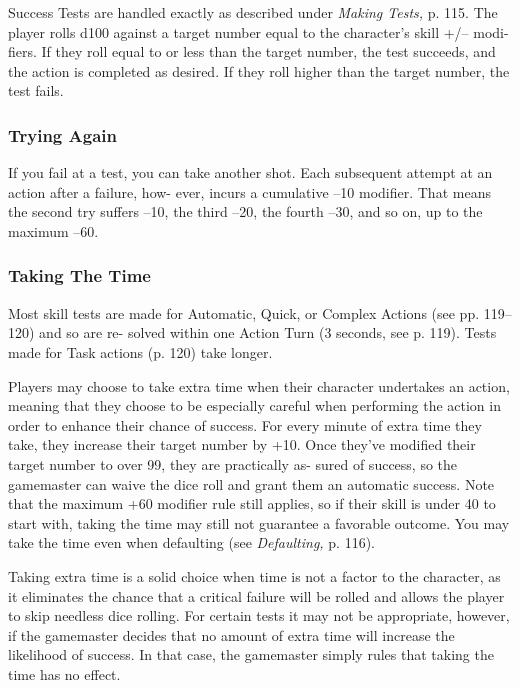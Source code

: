 Success Tests are handled exactly as described under 
\textit{Making Tests,} p. 115. The player rolls d100 against a 
target number equal to the character's skill +/– modi-
fiers. If they roll equal to or less than the target number, 
the test succeeds, and the action is completed as desired. 
If they roll higher than the target number, the test fails.

\subsubsection{Trying Again}

If you fail at a test, you can take another shot. Each 
subsequent attempt at an action after a failure, how-
ever, incurs a cumulative –10 modifier. That means the 
second try suffers –10, the third –20, the fourth –30, 
and so on, up to the maximum –60.

\subsubsection{Taking The Time}

Most skill tests are made for Automatic, Quick, or 
Complex Actions (see pp. 119–120) and so are re-
solved within one Action Turn (3 seconds, see p. 119). 
Tests made for Task actions (p. 120) take longer.

Players may choose to take extra time when their 
character undertakes an action, meaning that they 
choose to be especially careful when performing the 
action in order to enhance their chance of success. For 
every minute of extra time they take, they increase 
their target number by +10. Once they've modified 
their target number to over 99, they are practically as-
sured of success, so the gamemaster can waive the dice 
roll and grant them an automatic success. Note that 
the maximum +60 modifier rule still applies, so if their 
skill is under 40 to start with, taking the time may still 
not guarantee a favorable outcome. You may take the 
time even when defaulting (see \textit{Defaulting, }p. 116).

Taking extra time is a solid choice when time is not 
a factor to the character, as it eliminates the chance 
that a critical failure will be rolled and allows the 
player to skip needless dice rolling. For certain tests it 
may not be appropriate, however, if the gamemaster 
decides that no amount of extra time will increase the 
likelihood of success. In that case, the gamemaster 
simply rules that taking the time has no effect.

